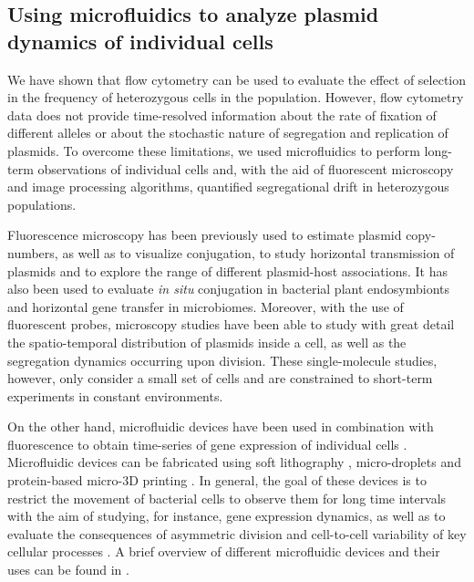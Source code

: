 \documentclass[fleqn,12pt]{wlscirep}
\begin{document}
\subsection{Using microfluidics to analyze plasmid dynamics of individual cells}

We have shown that flow cytometry can be used to evaluate the effect of selection in the frequency of heterozygous cells in the population. However, flow cytometry data does not provide time-resolved information about the rate of fixation of different alleles or about the stochastic nature of segregation and replication of plasmids. To overcome these limitations, we used microfluidics to perform long-term observations of individual cells and, with the aid of fluorescent microscopy and image processing algorithms, quantified segregational drift in heterozygous populations.

Fluorescence microscopy has been previously used to estimate plasmid copy-numbers\cite{ng2010plasmid,ref}, as well as to visualize conjugation\cite{babic2008direct}, to study horizontal transmission of plasmids\cite{del2012determination} and to explore the range of different plasmid-host associations\cite{shintani2014single}. It has also been used to evaluate {\em in situ} conjugation in bacterial plant endosymbionts\cite{banuelos2019conjugative} and horizontal gene transfer in microbiomes\cite{pinilla2018monitoring}.
Moreover, with the use of fluorescent probes, microscopy studies have been able to study with great detail the spatio-temporal distribution of plasmids inside a cell, as well as the segregation dynamics occurring upon division\cite{Reyes2013,Hsu2019,wang2016quantitative}.  These single-molecule studies, however, only consider a small set of cells and are constrained to short-term experiments in constant environments.

On the other hand, microfluidic devices have been used in combination with fluorescence to obtain time-series of gene expression of individual cells \cite{Young2012,tomanek2020gene}.  Microfluidic devices can be fabricated using soft lithography \cite{zhang2012inkjet,pan2011maskless}, micro-droplets \cite{boedicker2009microfluidic} and protein-based micro-3D printing \cite{connell2014real}. In general, the goal of these devices is to restrict the movement of bacterial cells to observe them for long time intervals with the aim of studying, for instance, gene expression dynamics\cite{Young2012,baumgart2017synchronized,bennett2009microfluidic,locke2009using}, as well as to evaluate the consequences of asymmetric division and cell-to-cell variability of key cellular processes \cite{mosheiff2017correlations,bergmiller2017biased,el2018heterogeneity}.
A brief overview of different microfluidic devices and their uses can be found in \cite{bennett2009microfluidic,potvin2018microfluidics}. 
\end{document}
